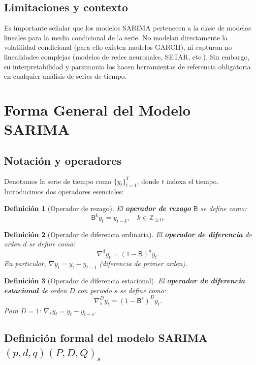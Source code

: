\documentclass[12pt,a4paper]{article}
\newtheorem{definicion}{Definición}[section]
\newcommand{\B}{\mathsf{B}}          %
\newcommand{\diff}{\nabla}           %
\begin{document}
\subsection{Limitaciones y contexto}

Es importante señalar que los modelos SARIMA pertenecen a la clase de modelos lineales para
la media condicional de la serie. No modelan directamente la volatilidad condicional (para
ello existen modelos GARCH), ni capturan no linealidades complejas (modelos de redes neuronales,
SETAR, etc.). Sin embargo, su interpretabilidad y parsimonia los hacen herramientas de referencia
obligatoria en cualquier análisis de series de tiempo.

\section{Forma General del Modelo SARIMA}

\subsection{Notación y operadores}

Denotamos la serie de tiempo como $\{y_t\}_{t=1}^{T}$, donde $t$ indexa el tiempo.
Introducimos dos operadores esenciales:

\begin{definicion}[Operador de rezago]
El \textbf{operador de rezago} $\B$ se define como:
\[
  \B^k y_t = y_{t-k}, \quad k \in \mathbb{Z}_{\geq 0}.
\]
\end{definicion}

\begin{definicion}[Operador de diferencia ordinaria]
El \textbf{operador de diferencia} de orden $d$ se define como:
\[
  \diff^d y_t = (1 - \B)^d y_t.
\]
En particular, $\diff y_t = y_t - y_{t-1}$ (diferencia de primer orden).
\end{definicion}

\begin{definicion}[Operador de diferencia estacional]
El \textbf{operador de diferencia estacional} de orden $D$ con periodo $s$ se define como:
\[
  \diff_s^D y_t = (1 - \B^s)^D y_t.
\]
Para $D=1$: $\diff_s y_t = y_t - y_{t-s}$.
\end{definicion}

\subsection{Definición formal del modelo SARIMA$(p,d,q)(P,D,Q)_s$}
\end{document}

